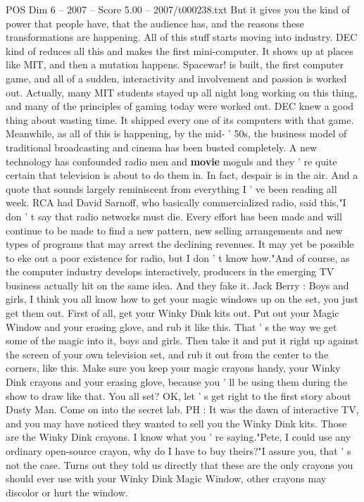 \begin{textsample}{POS Dim 6 – 2007 – Score 5.00 – 2007/t000238.txt}
But it gives you the kind of power that people have, that the audience has, and the reasons these transformations are happening.
All of this stuff starts moving into industry.
DEC kind of reduces all this and makes the first mini-computer.
It shows up at places like MIT, and then a mutation happens.
Spacewar! is built, the first computer game, and all of a sudden, interactivity and involvement and passion is worked out.
Actually, many MIT students stayed up all night long working on this thing, and many of the principles of gaming today were worked out.
DEC knew a good thing about wasting time.
It shipped every one of its computers with that game.
Meanwhile, as all of this is happening, by the mid- ' 50s, the business model of traditional broadcasting and cinema has been busted completely.
A new technology has confounded radio men and \textbf{movie} moguls and they ' re quite certain that television is about to do them in.
In fact, despair is in the air.
And a quote that sounds largely reminiscent from everything I ' ve been reading all week.
RCA had David Sarnoff, who basically commercialized radio, said this,"I don ' t say that radio networks must die.
Every effort has been made and will continue to be made to find a new pattern, new selling arrangements and new types of programs that may arrest the declining revenues.
It may yet be possible to eke out a poor existence for radio, but I don ' t know how."And of course, as the computer industry develops interactively, producers in the emerging TV business actually hit on the same idea.
And they fake it.
Jack Berry : Boys and girls, I think you all know how to get your magic windows up on the set, you just get them out.
First of all, get your Winky Dink kits out.
Put out your Magic Window and your erasing glove, and rub it like this.
That ' s the way we get some of the magic into it, boys and girls.
Then take it and put it right up against the screen of your own television set, and rub it out from the center to the corners, like this.
Make sure you keep your magic crayons handy, your Winky Dink crayons and your erasing glove, because you ' ll be using them during the show to draw like that.
You all set?
OK, let ' s get right to the first story about Dusty Man.
Come on into the secret lab.
PH : It was the dawn of interactive TV, and you may have noticed they wanted to sell you the Winky Dink kits.
Those are the Winky Dink crayons.
I know what you ' re saying."Pete, I could use any ordinary open-source crayon, why do I have to buy theirs?"I assure you, that ' s not the case.
Turns out they told us directly that these are the only crayons you should ever use with your Winky Dink Magic Window, other crayons may discolor or hurt the window.

\end{textsample}
